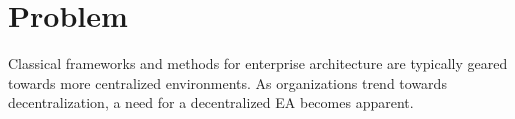 \chapter{Problem}
Classical frameworks and methods for enterprise architecture are typically geared towards more centralized environments. As organizations trend towards decentralization, a need for a decentralized EA becomes apparent.